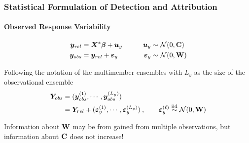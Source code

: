 \documentclass{beamer}
\newcommand{\C}{\ensuremath{\text{Cov}}}
\newcommand{\iid}{\ensuremath{\stackrel{\text{iid}}{\sim}}}
\def\*#1{\bm{#1}}
\def\C{\textbf{\text{C}}}
\def\W{\textbf{\text{W}}}
\begin{document}
\begin{frame}
\frametitle{Statistical Formulation of Detection and Attribution}
\framesubtitle{Observed Response Variability}

\begin{block}{}
\vspace*{-\baselineskip}\setlength\belowdisplayshortskip{0pt}
\begin{alignat*}{3}
\*y_{rel} &= \*X^* \*\beta + \*u_y \nonumber  \qquad  &\*u_y &\sim \mathcal N(0,\C) \\
\*y_{obs} &= \*y_{rel} + \*\varepsilon_y &\*\varepsilon_y &\sim \mathcal N(0,\W)
\end{alignat*}
\end{block}

 Following the notation of the multimember ensembles with $L_y$ as the size of the observational ensemble
\begin{align*}
\*Y_{obs} &= ( \*y_{obs}^{(1)}, \cdots,  \*y_{obs}^{(L_y)}) \\
 &=  \*Y_{rel} + (  \*\varepsilon_y^{(1)}, \cdots,   \*\varepsilon_y^{(L_y)}) \: , \qquad \*\varepsilon_y^{(\ell)} \iid \mathcal N(0,\W) \\
\end{align*}

\alert{Information about $\W$ may be from gained from multiple observations, but information about $\C$ does not increase!}

\end{frame}
\end{document}
